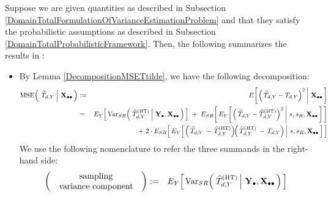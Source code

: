 \vskip 0.1cm
\noindent
Suppose we are given quantities as described in Subsection
\ref{DomainTotalFormulationOfVarianceEstimationProblem}
and
that they satisfy the probabilistic assumptions as described in Subsection
\ref{DomainTotalProbabilisticFramework}.
\vskip 0.1cm
\noindent
Then, the following summarizes the results in \cite{Beaumont2011}:
\begin{itemize}
\item
    By Lemma \ref{DecompositionMSETtilde}, we have the following decomposition:
    \begin{eqnarray*}
    \MSE\!\left(\;
        \left.
        \widetilde{T}_{d,Y}
        \;\right\vert\,
        \Xobs
        \,\right)
    & := &
        E\!\left[
            \left.
            \left(\,\widetilde{T}_{d,Y} - T_{d,Y}\right)^{2}
            \,\right\vert\,
            \Xobs
            \,\right]
    \\
    & = &
        E_{Y}\!\left[\,
        \Var_{SR}\!\left(\,
            \left.
            \widehat{T}^{\textnormal{(HT)}}_{d,Y}
            \,\right\vert\,
            \Ydot,
            \Xobs
            \,\right)
            \,\right]
        \;+\;
        E_{SR}\!\left[\,
        E_{Y}\!\left[
            \left.
            \left(\,\widetilde{T}_{d,Y} - \widehat{T}^{\textnormal{(HT)}}_{d,Y}\right)^{2}
            \,\right\vert\,
            s,s_{R},\Xobs
            \,\right]
            \,\right]
    \\
    &&
        +\;2\cdot
        E_{SR}\!\left[\,
        E_{Y}\!\left[
            \left.
            \left(\,\widetilde{T}_{d,Y} \,-\, \widehat{T}^{\textnormal{(HT)}}_{d,Y}\right)
            \!\!
            \left(\,\widehat{T}^{\textnormal{(HT)}}_{d,Y} \,-\, T_{d,Y}\right)
            \,\right\vert\,
            s,s_{R},\Xobs
            \,\right]
            \,\right]
    \end{eqnarray*}
    We use the following nomenclature to refer the three summands in the right-hand side:
    \begin{eqnarray*}
    \left(\begin{array}{c}
        \textnormal{sampling}
        \\
        \textnormal{\;\,variance component\;\,}
        \end{array}\right)
    & := &
        E_{Y}\!\left[\,
        \Var_{SR}\!\left(\,
            \left.
            \widehat{T}^{\textnormal{(HT)}}_{d,Y}
            \,\right\vert\,
            \Ydot,
            \Xobs
            \,\right)
            \,\right]
    \\

\end{eqnarray*}
\end{itemize}
